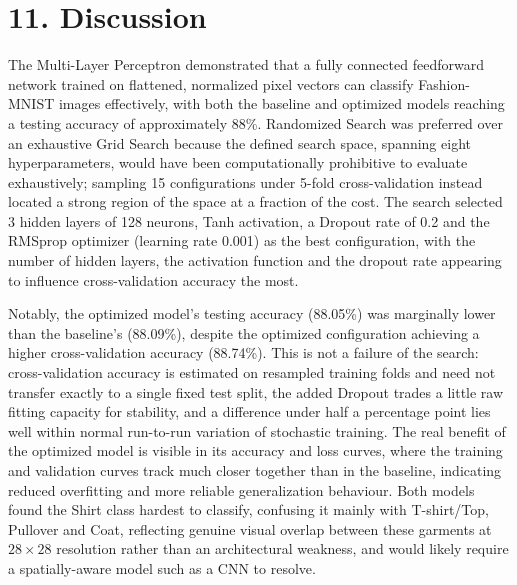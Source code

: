 \documentclass[11pt,a4paper]{article}
\begin{document}
\section*{11. Discussion}

The Multi-Layer Perceptron demonstrated that a fully connected feedforward network trained on flattened, normalized pixel vectors can classify Fashion-MNIST images effectively, with both the baseline and optimized models reaching a testing accuracy of approximately 88\%. Randomized Search was preferred over an exhaustive Grid Search because the defined search space, spanning eight hyperparameters, would have been computationally prohibitive to evaluate exhaustively; sampling 15 configurations under 5-fold cross-validation instead located a strong region of the space at a fraction of the cost. The search selected 3 hidden layers of 128 neurons, Tanh activation, a Dropout rate of 0.2 and the RMSprop optimizer (learning rate 0.001) as the best configuration, with the number of hidden layers, the activation function and the dropout rate appearing to influence cross-validation accuracy the most.

Notably, the optimized model's testing accuracy (88.05\%) was marginally lower than the baseline's (88.09\%), despite the optimized configuration achieving a higher cross-validation accuracy (88.74\%). This is not a failure of the search: cross-validation accuracy is estimated on resampled training folds and need not transfer exactly to a single fixed test split, the added Dropout trades a little raw fitting capacity for stability, and a difference under half a percentage point lies well within normal run-to-run variation of stochastic training. The real benefit of the optimized model is visible in its accuracy and loss curves, where the training and validation curves track much closer together than in the baseline, indicating reduced overfitting and more reliable generalization behaviour. Both models found the Shirt class hardest to classify, confusing it mainly with T-shirt/Top, Pullover and Coat, reflecting genuine visual overlap between these garments at $28\times28$ resolution rather than an architectural weakness, and would likely require a spatially-aware model such as a CNN to resolve.
\end{document}
